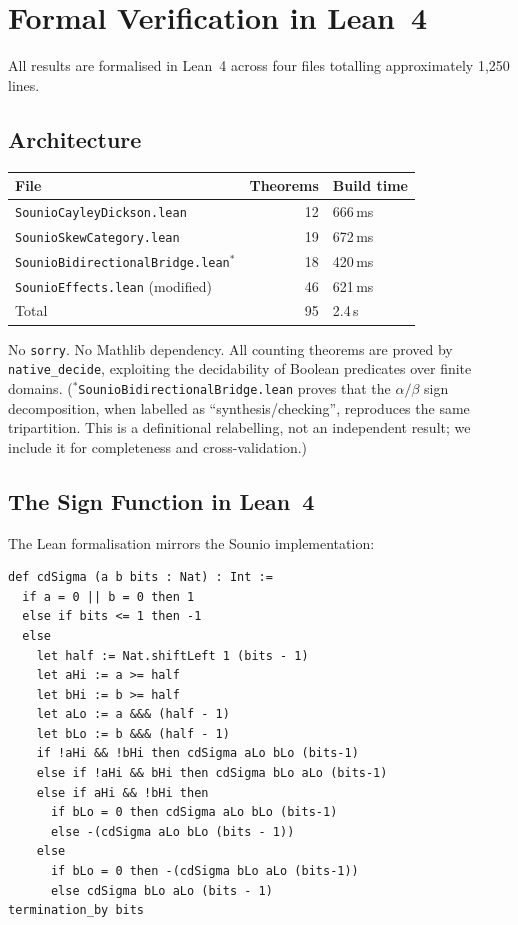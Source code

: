 \documentclass[11pt,a4paper]{article}
\theoremstyle{definition}
\theoremstyle{remark}
\begin{document}
\section{Formal Verification in Lean~4}\label{sec:formal}

All results are formalised in Lean~4 \cite{moura2021lean4} across
four files totalling approximately 1,250 lines.

\subsection{Architecture}

\begin{center}
\begin{tabular}{lrl}
\toprule
File & Theorems & Build time \\
\midrule
\texttt{SounioCayleyDickson.lean} & 12 & 666\,ms \\
\texttt{SounioSkewCategory.lean} & 19 & 672\,ms \\
\texttt{SounioBidirectionalBridge.lean}$^*$ & 18 & 420\,ms \\
\texttt{SounioEffects.lean} (modified) & 46 & 621\,ms \\
\midrule
Total & 95 & 2.4\,s \\
\bottomrule
\end{tabular}
\end{center}

No \texttt{sorry}. No Mathlib dependency. All counting theorems are
proved by \texttt{native\_decide}, exploiting the decidability of
Boolean predicates over finite domains.
($^*$\texttt{SounioBidirectionalBridge.lean} proves that the
$\alpha/\beta$ sign decomposition, when labelled as
``synthesis/checking'', reproduces the same tripartition. This is a
definitional relabelling, not an independent result; we include it for
completeness and cross-validation.)

\subsection{The Sign Function in Lean~4}

The Lean formalisation mirrors the Sounio implementation:

\begin{lstlisting}[language=Lean4]
def cdSigma (a b bits : Nat) : Int :=
  if a = 0 || b = 0 then 1
  else if bits <= 1 then -1
  else
    let half := Nat.shiftLeft 1 (bits - 1)
    let aHi := a >= half
    let bHi := b >= half
    let aLo := a &&& (half - 1)
    let bLo := b &&& (half - 1)
    if !aHi && !bHi then cdSigma aLo bLo (bits-1)
    else if !aHi && bHi then cdSigma bLo aLo (bits-1)
    else if aHi && !bHi then
      if bLo = 0 then cdSigma aLo bLo (bits-1)
      else -(cdSigma aLo bLo (bits - 1))
    else
      if bLo = 0 then -(cdSigma bLo aLo (bits-1))
      else cdSigma bLo aLo (bits - 1)
termination_by bits
\end{lstlisting}
\end{document}
